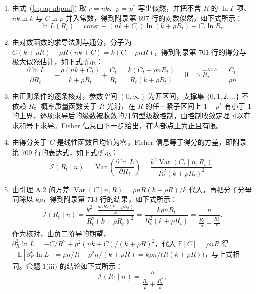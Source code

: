 \begin{enumerate}
\item 由式~(\ref{eq:ap-nbpmf}) 取 $r=nk$、$p=p^*$ 写出似然，并把不含 $R$ 的 $\ln\Gamma$ 项、$nk\ln k$ 与 $C\ln\rho$ 并入常数，得到附录第 697 行的对数似然，如下式所示：
\begin{equation*}
\ln L(R_t) = \text{const} - (nk + C_t) \ln(k + \rho R_t) + C_t \ln R_t.
\tag*{原文第 697 行}
\end{equation*}
\item 由对数函数的求导法则与通分，分子为 $C(k+\rho R)-\rho R(nk+C)=k(C-\rho nR)$，得到附录第 701 行的得分与极大似然估计，如下式所示：
\begin{equation*}
\frac{\partial \ln L}{\partial R_t} = -\frac{\rho(nk + C_t)}{k + \rho R_t} + \frac{C_t}{R_t} = \frac{k(C_t - \rho n R_t)}{R_t(k + \rho R_t)} = 0 \implies \widehat{R}_t^{\text{MLE}} = \frac{C_t}{\rho n}.
\tag*{原文第 701 行}
\end{equation*}
\item 由正则条件的逐条核对，参数空间 $(0,\infty)$ 为开区间，支撑集 $\{0,1,2,\dots\}$ 不依赖 $R$。概率质量函数关于 $R$ 光滑，在 $R$ 的任一紧子区间上 $1-p^*$ 有小于 1 的上界，逐项求导后的级数被收敛的几何型级数控制，由控制收敛定理可以在求和号下求导。Fisher 信息由下一步给出，在内部点上为正且有限。
\item 由得分关于 $C$ 是线性函数且均值为零，Fisher 信息等于得分的方差，即附录第 709 行的表达式，如下式所示：
\begin{equation*}
\mathcal{I}(R_t \mid n) = \operatorname{Var}\left(\frac{\partial \ln L}{\partial R_t}\right) = \frac{k^2 \operatorname{Var}(C_t \mid n, R_t)}{R_t^2(k + \rho R_t)^2}.
\tag*{原文第 709 行}
\end{equation*}
\item 由引理 A.2 的方差 $\operatorname{Var}(C\mid n,R)=\rho nR(k+\rho R)/k$ 代入，再把分子分母同除以 $k\rho$，得到附录第 713 行的结果，如下式所示：
\begin{equation*}
\mathcal{I}(R_t \mid n) = \frac{k^2 \cdot \frac{\rho n R_t(k + \rho R_t)}{k}}{R_t^2(k + \rho R_t)^2} = \frac{k \rho n R_t}{R_t^2(k + \rho R_t)} = \frac{n}{\frac{R_t}{\rho} + \frac{R_t^2}{k}}.
\tag*{原文第 713 行}
\end{equation*}
作为核对，由负二阶导的期望，$\partial_R^2\ln L=-C/R^2+\rho^2(nk+C)/(k+\rho R)^2$，代入 $\mathbb{E}[C]=\rho nR$ 得 $-\mathbb{E}[\partial_R^2\ln L]=\rho n/R-\rho^2n/(k+\rho R)=k\rho n/\big(R(k+\rho R)\big)$，与上式相同。命题 1(iii) 的结论如下式所示：
\begin{equation*}
\mathcal{I}(R_t \mid n) = \frac{n}{\frac{R_t}{\rho} + \frac{R_t^2}{k}};

\end{equation*}
\end{enumerate}
